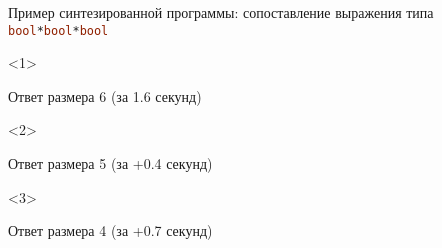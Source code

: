 \documentclass[aspectratio=169
  , xcolor={svgnames}
  , hyperref={ colorlinks,citecolor=Blue
             , linkcolor=DarkRed,urlcolor=DarkBlue}
  , russian
  ]{beamer}
\begin{document}
\begin{frame}[fragile]{Пример синтезированной программы: сопоставление выражения типа \lstinline[language=ocaml]{bool*bool*bool}}
\begin{minipage}[c][7cm][t]{0.35\linewidth}\vspace{0em}
\begin{minipage}{0.35\linewidth}
\synthInputA
\end{minipage}
\end{minipage}
\begin{minipage}{0.63\linewidth}\vspace{0em}
\begin{onlyenv}<1>\begin{minipage}{0.63\linewidth}
Ответ размера  6 (за 1.6 секунд)
\synthResultA
\end{minipage}\end{onlyenv}
%
\begin{onlyenv}<2>\begin{minipage}{0.63\linewidth}
Ответ размера 5 (за +0.4 секунд)
\synthResultB
\end{minipage}\end{onlyenv}
\begin{onlyenv}<3>\begin{minipage}{0.63\linewidth}
Ответ размера 4 (за +0.7 секунд)
\synthResultC
\end{minipage}\end{onlyenv}
\end{minipage}
\end{frame}

\end{document}
